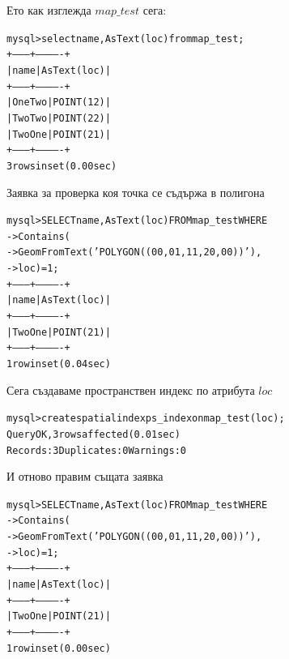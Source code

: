 \documentclass{beamer}
\begin{document}
\begin{frame}[fragile]
\begin{beamerboxesrounded}{Ето как изглежда $map\_test$ сега:}
\begin{alltt}
mysql> select name, AsText(loc) from map_test;
+---------+-------------+
| name    | AsText(loc) |
+---------+-------------+
| One Two | POINT(1 2)  |
| Two Two | POINT(2 2)  |
| Two One | POINT(2 1)  |
+---------+-------------+
3 rows in set (0.00 sec)
\end{alltt}
\end{beamerboxesrounded}
\end{frame}

\begin{frame}[fragile]
\begin{beamerboxesrounded}{Заявка за проверка коя точка се съдържа в полигона}
\begin{alltt}
mysql> SELECT name, AsText(loc) FROM map_test WHERE
    -> Contains(
    -> GeomFromText('POLYGON((0 0, 0 1, 1 1, 2 0, 0 0))'),
    -> loc) = 1;
+---------+-------------+
| name    | AsText(loc) |
+---------+-------------+
| Two One | POINT(2 1)  |
+---------+-------------+
\alert{1 row in set (0.04 sec)}
\end{alltt}
\end{beamerboxesrounded}
\end{frame}

\begin{frame}[fragile]
\begin{beamerboxesrounded}{Сега създаваме пространствен индекс по атрибута $loc$}
\begin{alltt}
mysql> create spatial index ps_index on map_test(loc);
Query OK, 3 rows affected (0.01 sec)
Records: 3  Duplicates: 0  Warnings: 0
\end{alltt}
\end{beamerboxesrounded}
\end{frame}

\begin{frame}[fragile]
\begin{beamerboxesrounded}{И отново правим същата заявка}
\begin{alltt}
mysql>  SELECT name, AsText(loc) FROM map_test WHERE
    ->  Contains(
    ->  GeomFromText('POLYGON((0 0, 0 1, 1 1, 2 0, 0 0))'),
    ->  loc) = 1;
+---------+-------------+
| name    | AsText(loc) |
+---------+-------------+
| Two One | POINT(2 1)  |
+---------+-------------+
\alert{1 row in set (0.00 sec)}
\end{alltt}
\end{beamerboxesrounded}
\end{frame}
\end{document}

